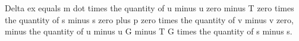 Delta ex equals m dot times the quantity of u minus u zero minus T zero times the quantity of s minus s zero plus p zero times the quantity of v minus v zero, minus the quantity of u minus u G minus T G times the quantity of s minus s.